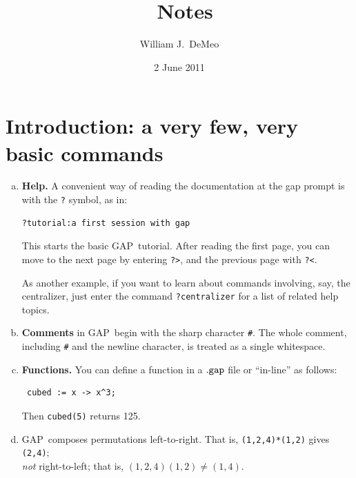 \documentclass[11pt]{amsart}
\title{\gap\ Notes}
\author{William J.~DeMeo}
\date{2 June 2011}
\newcommand{\gap}{GAP}   %
\theoremstyle{plain}
\newcommand{\codesize}{\footnotesize}
\newcommand{\<}{\ensuremath{\langle}}
\renewcommand{\>}{\ensuremath{\rangle}}
\begin{document}
\maketitle
\tableofcontents

\newpage

\section{Introduction: a very few, very basic commands}
\begin{enumerate}[a.]
\item {\bf Help.}  A convenient way of reading the documentation at the gap prompt is
 with the {\tt ?} symbol, as in:
{\codesize
\begin{verbatim}
?tutorial:a first session with gap
\end{verbatim}}
\noindent This starts the basic \gap\ tutorial.  After reading the first page,
you can move to the next page by entering {\tt ?>}, and the previous page with
{\tt ?<}.  

As another example, if you want to learn about commands involving, say,
the centralizer, just enter the command
{\tt ?centralizer} for a list of related help topics.

\item {\bf Comments} 
in \gap\ begin with the sharp character {\tt \#}.  The whole comment, including
{\tt \#} and the newline character, is treated as a single whitespace. 

\item {\bf Functions.} You can define a function in a ${\tt .gap}$ file or ``in-line'' as follows:
{\codesize
\begin{verbatim}
 cubed := x -> x^3;
\end{verbatim}}
\noindent Then {\tt cubed(5)} returns 125.

\item 
\gap\ composes permutations left-to-right.  
That is, \verb|(1,2,4)*(1,2)| gives \verb|(2,4)|;\\
\emph{not} right-to-left; that is, $(1,2,4)(1,2) \neq (1,4)$.


\end{enumerate}
\end{document}
